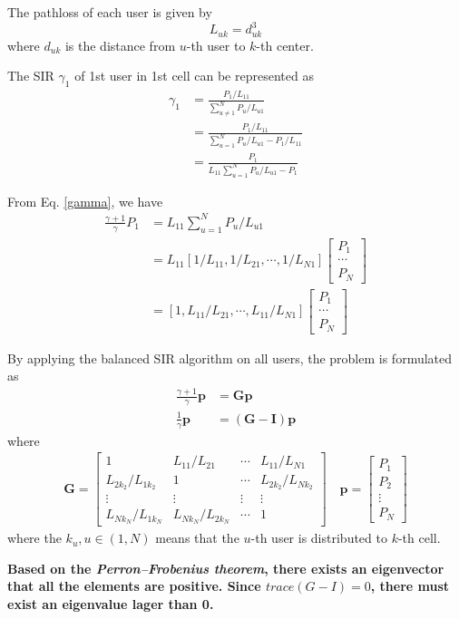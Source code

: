 \documentclass[12pt]{article}
\begin{document}
The pathloss of each user is given by
\begin{equation}
L_{uk} = d_{uk}^3
\end{equation}
where $d_{uk}$ is the distance from $u$-th user to $k$-th center.

The SIR $\gamma_1$ of 1st user in 1st cell can be represented as
\begin{align}\label{gamma}
	\gamma_1 &= \frac{P_1/L_{11}}{\sum_{u\neq 1}^{N}P_{u}/L_{u1}} \nonumber\\
	&= \frac{P_1/L_{11}}{\sum_{u=1}^{N}P_{u}/L_{u1} - P_1/L_{11}} \nonumber\\
	&= \frac{P_1}{L_{11}\sum_{u=1}^{N}P_{u}/L_{u1} - P_1} 
\end{align}

From Eq. \eqref{gamma}, we have
\begin{align}
\frac{\gamma+1}{\gamma}P_1 &= L_{11}\sum_{u=1}^{N}P_{u}/L_{u1} \\
& = L_{11} 
[1/L_{11}, 1/L_{21},\cdots, 1/L_{N1}]
\begin{bmatrix}
P_{1}\\
\cdots \\
P_{N}
\end{bmatrix}\\
&=[1, L_{11}/L_{21},\cdots, L_{11}/L_{N1}]
\begin{bmatrix}
P_{1}\\
\cdots \\
P_{N}
\end{bmatrix}
\end{align}

By applying the balanced SIR algorithm on all users, the problem is formulated as
\begin{align}
\frac{\gamma+1}{\gamma}\bm{p} &= \bm{G}\bm{p}\\
\frac{1}{\gamma}\bm{p} &= (\bm{G}-\bm{I})\bm{p}
\end{align}
where 
\begin{align}
\bm{G} = 
\begin{bmatrix}
1& L_{11}/L_{21}&\cdots& L_{11}/L_{N1}\\
L_{2k_2}/L_{1k_2}& 1&\cdots& L_{2k_2}/L_{Nk_2}\\
\vdots&\vdots&\vdots&\vdots\\
L_{Nk_N}/L_{1k_N}& L_{Nk_N}/L_{2k_N}&\cdots& 1
\end{bmatrix}
\quad
\bm{p} =
\begin{bmatrix}
P_{1}\\
P_{2}\\
\vdots\\
P_N
\end{bmatrix}
\end{align}
where the $k_u,u\in (1, N)$ means that the $u$-th user is distributed to $k$-th cell.

\textbf{Based on the \textit{Perron–Frobenius theorem}, there exists an eigenvector that all the elements are positive. Since $trace(G-I)=0$, there must exist an eigenvalue lager than 0.}
%
%
\end{document}
